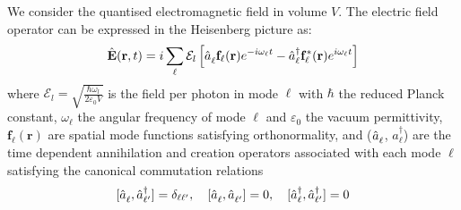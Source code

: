 We consider the quantised electromagnetic field in volume $V$. The electric field operator can be expressed in the Heisenberg picture as:
\begin{equation}
\hat{\mathbf{E}}(\mathbf{r}, t) = i \sum_{ \ell} \mathcal{E}_l \left[\hat{a}_{\ell}^{\vphantom{dagger}}\mathbf{f}_{\ell}(\mathbf{r})e^{-i\omega_{\ell}t} - \hat{a}_{\ell}^\dagger \mathbf{f}_{\ell}^*(\mathbf{r}) e^{i\omega_{\ell}t}\right]
\end{equation}
where $\mathcal{E}_l = \sqrt{\frac{\hbar \omega_l}{2 \varepsilon_0 V}}$ is the field per photon in mode $\ell$ with $\hbar$ the reduced Planck constant, $\omega_\ell$ the angular frequency of mode $\ell$ and $\varepsilon_0$ the vacuum permittivity, $\mathbf{f}_{\ell}(\mathbf{r})$ are spatial mode functions satisfying orthonormality, and ($\hat{a}_{\ell}^{\vphantom{\dagger}}$, $\hat{a}_{\ell}^{\dagger}$) are the time dependent annihilation and creation operators associated with each mode $\ell$ satisfying the canonical commutation relations
\[
[\hat{a}_{\ell}^{\vphantom{\dagger}}, \hat{a}_{\ell'}^\dagger] = \delta_{\ell \ell'} , \quad
[\hat{a}_{\ell}^{\vphantom{\dagger}}, \hat{a}_{\ell'}^{\vphantom{\dagger}} ] = 0, \quad [\hat{a}_{\ell}^\dagger , \hat{a}_{\ell'}^\dagger ] = 0  
\]
